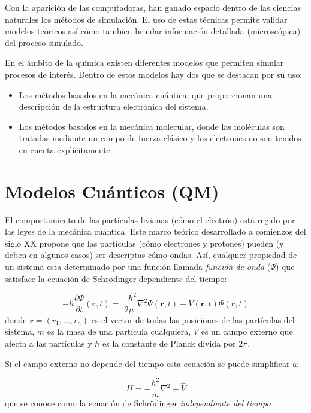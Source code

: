 Con la aparici\'on de las computadoras, han ganado espacio dentro de las ciencias naturales los m\'etodos de simulaci\'on.
El uso de estas t\'ecnicas permite validar modelos te\'oricos as\'i c\'omo tambien brindar informaci\'on detallada (microsc\'opica) del proceso simulado.

En el \'ambito de la qu\'imica existen diferentes modelos que permiten simular procesos de inter\'es.
Dentro de estos modelos hay dos que se destacan por su uso:
\begin{itemize}
\item Los m\'etodos basados en la mec\'anica cu\'antica, que proporcionan una descripci\'on de la estructura electr\'onica del sistema.

\item Los m\'etodos basados en la mec\'anica molecular, donde las mol\'eculas son tratadas mediante un campo de fuerza cl\'asico y los electrones no son tenidos en cuenta expl\'icitamente.
\end{itemize}

\section{Modelos Cu\'anticos (QM)}

El comportamiento de las part\'iculas livianas (c\'omo el electr\'on) est\'a regido por las leyes de la mec\'anica cu\'antica.
Este marco te\'orico desarrollado a comienzos del siglo XX propone que las part\'iculas (c\'omo electrones y protones) pueden (y deben en algunos casos)
ser descriptas c\'omo ondas. As\'i, cualquier propiedad de un sistema esta determinado por una funci\'on llamada \emph{funci\'on de onda} ($\Psi$) que satisface la ecuaci\'on de Schr\"{o}dinger dependiente del tiempo:

\begin{equation}
    \label{schro_time_dep}
    -\hbar\frac{\partial \Psi}{\partial t} (\mathbf{r},t) = \frac{-\hbar^2}{2\mu}\nabla^2 \Psi(\mathbf{r},t) + V(\mathbf{r},t) \Psi(\mathbf{r},t)
\end{equation}
donde $\mathbf{r} = (r_1,\dots,r_n)$ es el vector de todas las posiciones de las part\'iculas del sistema,
$m$ es la masa de una part\'icula cualquiera, $V$ es un campo externo que afecta a las part\'iculas y
$\hbar$ es la constante de Planck divida por $2\pi$. 

Si el campo externo no depende del tiempo esta ecuaci\'on se puede simplificar a:

\begin{equation*}
    \hat{H} =  -\frac{\hbar^2}{m} \nabla^2 + \hat{V}
\end{equation*}
que se conoce como la ecuaci\'on de Schr\"{o}dinger \textit{independiente del tiempo}

